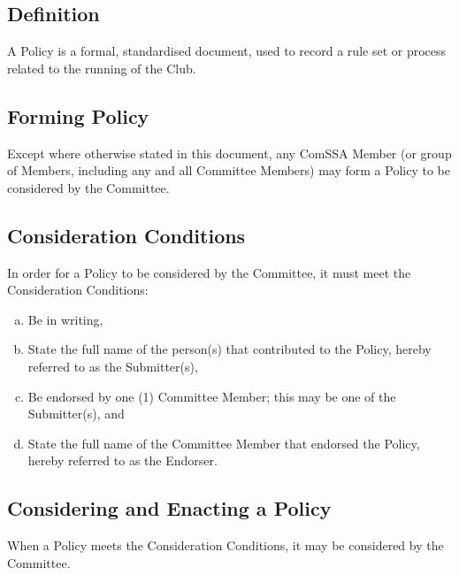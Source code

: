 \documentclass[a4paper,12pt]{article}
\begin{document}
\subsection{Definition}

A Policy is a formal, standardised document, used to record a rule set or process related to the running of the Club.

\subsection{Forming Policy}

Except where otherwise stated in this document, any ComSSA Member (or group of Members, including any and all Committee Members) may form a Policy to be considered by the Committee.

\subsection{Consideration Conditions}

In order for a Policy to be considered by the Committee, it must meet the Consideration Conditions:

\begin{enumerate}[a)]
	\item Be in writing,
	\item State the full name of the person(s) that contributed to the Policy, hereby referred to as the Submitter(s),
	\item Be endorsed by one (1) Committee Member; this may be one of the Submitter(s), and
	\item State the full name of the Committee Member that endorsed the Policy, hereby referred to as the Endorser.
\end{enumerate}

\subsection{Considering and Enacting a Policy}

When a Policy meets the Consideration Conditions, it may be considered by the Committee.
\end{document}
